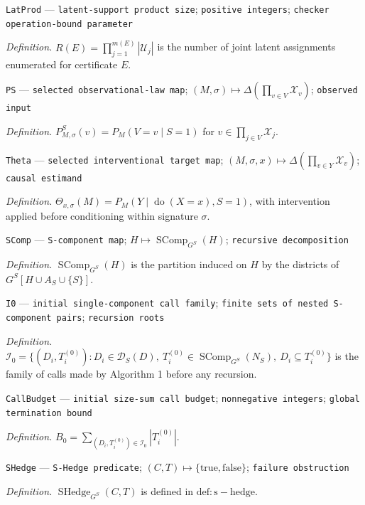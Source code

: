 \documentclass{article}
\begin{document}
\begin{itemize}
{  \item \texttt{LatProd} --- \texttt{latent-\allowbreak{}support product size}; \texttt{positive integers}; \texttt{checker operation-\allowbreak{}bound parameter}
  \par\smallskip\noindent\emph{Definition.} \(R(E)=\prod_{j=1}^{m(E)}|\mathcal U_j|\) is the number of joint latent assignments enumerated for certificate \(E\).
  \item \texttt{PS} --- \texttt{selected observational-\allowbreak{}law map}; \((M,\sigma)\mapsto\Delta(\prod_{v\in V}\mathcal X_v)\); \texttt{observed input}
  \par\smallskip\noindent\emph{Definition.} \(P_{M,\sigma}^S(v)=P_M(V=v\mid S=1)\) for \(v\in\prod_{j\in V}\mathcal X_j\).
  \item \texttt{Theta} --- \texttt{selected interventional target map}; \((M,\sigma,x)\mapsto\Delta(\prod_{v\in Y}\mathcal X_v)\); \texttt{causal estimand}
  \par\smallskip\noindent\emph{Definition.} \(\Theta_{x,\sigma}(M)=P_M(Y\mid\operatorname{do}(X=x),S=1)\), with intervention applied before conditioning within signature \(\sigma\).
  \item \texttt{SComp} --- \texttt{S-\allowbreak{}component map}; \(H\mapsto\operatorname{SComp}_{G^S}(H)\); \texttt{recursive decomposition}
  \par\smallskip\noindent\emph{Definition.} \(\operatorname{SComp}_{G^S}(H)\) is the partition induced on \(H\) by the districts of \(G^S[H\cup A_S\cup\{S\}]\).
  \item \texttt{I0} --- \texttt{initial single-\allowbreak{}component call family}; \texttt{finite sets of nested S-\allowbreak{}component pairs}; \texttt{recursion roots}
  \par\smallskip\noindent\emph{Definition.} \(\mathcal I_0=\{(D_i,T_i^{(0)}):D_i\in\mathcal D_S(D),\ T_i^{(0)}\in\operatorname{SComp}_{G^S}(N_S),\ D_i\subseteq T_i^{(0)}\}\) is the family of calls made by Algorithm 1 before any recursion.
  \item \texttt{CallBudget} --- \texttt{initial size-\allowbreak{}sum call budget}; \texttt{nonnegative integers}; \texttt{global termination bound}
  \par\smallskip\noindent\emph{Definition.} \(B_0=\sum_{(D_i,T_i^{(0)})\in\mathcal I_0}|T_i^{(0)}|\).
  \item \texttt{SHedge} --- \texttt{S-\allowbreak{}Hedge predicate}; \((C,T)\mapsto\{\mathrm{true},\mathrm{false}\}\); \texttt{failure obstruction}
  \par\smallskip\noindent\emph{Definition.} \(\operatorname{SHedge}_{G^S}(C,T)\) is defined in \(\mathrm{def:s-hedge}\).
}
\end{itemize}
\end{document}
